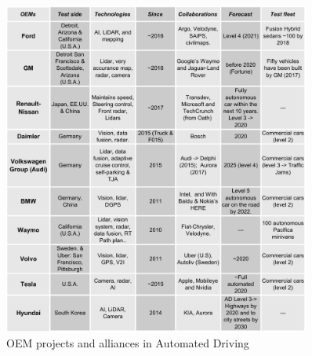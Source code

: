 \begin{figure}[t]
    \centering
    \includegraphics[width=0.9\textwidth]{"img/OEM_jp_trim"}
    \caption{OEM projects and alliances in Automated Driving}
    \label{fig:oem-ad}
\end{figure}

